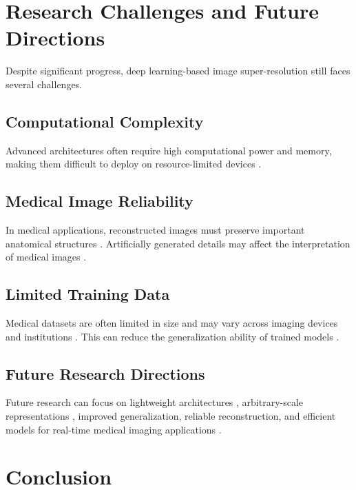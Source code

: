 \documentclass[conference]{IEEEtran}
\begin{document}
\section{Research Challenges and Future Directions}

Despite significant progress, deep learning-based image super-resolution still faces several challenges.

\subsection{Computational Complexity}

Advanced architectures often require high computational power and memory, making them difficult to deploy on resource-limited devices \cite{wang2019awsrn, chen2020esasn, zhang2021ecbsr, wang2022sffn, gankhuyag2023scsrn, tang2025ldian, liu2025baid}.

\subsection{Medical Image Reliability}

In medical applications, reconstructed images must preserve important anatomical structures \cite{andonotopo2026fetal8k, zhu2019lfsr}. Artificially generated details may affect the interpretation of medical images \cite{zhang2022medsrnet, yang2025msffgan}.

\subsection{Limited Training Data}

Medical datasets are often limited in size and may vary across imaging devices and institutions \cite{boumeridja2025fetal, iskandar2023fetalbrain, poudel2025srmri}. This can reduce the generalization ability of trained models \cite{qiu2026rethinking}.

\subsection{Future Research Directions}

Future research can focus on lightweight architectures \cite{zou2022scet, aalishah2025mambalitesr}, arbitrary-scale representations \cite{pang2025nexpr}, improved generalization, reliable reconstruction, and efficient models for real-time medical imaging applications \cite{andonotopo2026realtime, chen2024ntire}.

\section{Conclusion}
\end{document}

